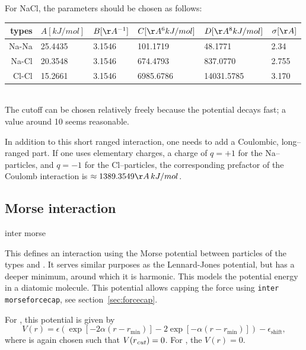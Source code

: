 For NaCl, the parameters should be chosen as follows:\\[.5em]
{\centering
  \begin{tabular}{r|l|l|l|l|l}
    types & $A [kJ/mol] $ & $B [\AA^{-1}]$ &
    $C [\AA^6 kJ/mol]$ & $D [\AA^8 kJ/mol]$ & $\sigma [\AA]$ \\
    \hline
    Na-Na & 25.4435 & 3.1546 &  101.1719 &    48.1771 & 2.34 \\
    Na-Cl & 20.3548 & 3.1546 &  674.4793 &   837.0770 & 2.755 \\
    Cl-Cl & 15.2661 & 3.1546 & 6985.6786 & 14031.5785 & 3.170 \\
  \end{tabular}
}\\[.5em]
The cutoff can be chosen relatively freely because the potential decays
fast; a value around 10 seems reasonable.

In addition to this short ranged interaction, one needs to add a Coulombic,
long--ranged part. If one uses elementary charges, \ie a charge of $q=+1$ for
the Na--particles, and $q=-1$ for the Cl--particles, the corresponding prefactor
of the Coulomb interaction is $\approx 1389.3549 \AA\,kJ/mol$.

\subsection{Morse interaction}

\begin{essyntax}
  inter   morse
  \var{$\epsilon$} \var{$\alpha$}  
  \begin{features}
  \end{features}
\end{essyntax}
This defines an interaction using the Morse potential between particles of the
types  and . It serves similar purposes as the
Lennard-Jones potential, but has a deeper minimum, around which it is harmonic.
This models the potential energy in a diatomic molecule.  This potential allows
capping the force using {\tt inter morseforcecap}, see
section~\ref{sec:forcecap}.

For , this potential is given by
\begin{equation}
  V(r)=\epsilon\left(\exp\left[-2 \alpha \left(r - r_\text{min}\right)\right]
    - 2\exp\left[-\alpha\left(r - r_\text{min}\right)\right]\right) -
  \epsilon_\text{shift},
\end{equation}
where  is again chosen such that
$V(r_\text{\mbox{\textrm{\textit{cut}}}})=0$. For , the $V(r)=0$.

